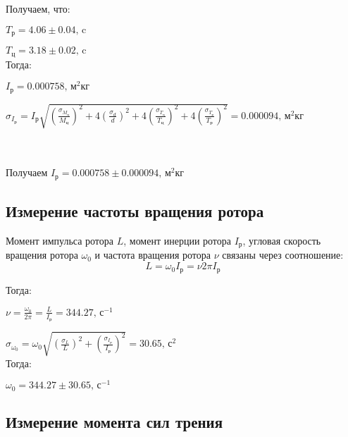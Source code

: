 \documentclass[a4paper]{article}
\begin{document}
Получаем, что:

\item $T_\text{р} = 4.06 \pm{0.04} \text{, c}$
\item $T_\text{ц} = 3.18 \pm{0.02} \text{, c}$\\

Тогда:

\item $I_\text{р} = 0.000758 \text{, м$^2$кг}$

\item $\sigma_{I_\text{р}} = I_\text{р} \sqrt{(\frac{\sigma_{M_\text{ц}}}{M_\text{ц}})^2 + 4 (\frac{\sigma_d}{d})^2 + 4 (\frac{\sigma_{T_\text{ц}}}{T_\text{ц}})^2 + 4 (\frac{\sigma_{T_\text{р}}}{T_\text{р}})^2} = 0.000094 \text{, м$^2$кг}$\\

\\\\

\item Получаем $I_\text{р} = 0.000758 \pm{0.000094} \text{, м$^2$кг}$


\subsection{Измерение частоты вращения ротора}

Момент импульса ротора $L$, момент инерции ротора $I_\text{р}$, угловая скорость вращения ротора $\omega_0$ и частота вращения ротора $\nu$ связаны через соотношение:
\begin{equation}
    L = \omega_0 I_\text{р} = \nu 2\pi I_\text{р}
\end{equation}

Тогда:

\item  $\nu = \frac{\omega_0}{2\pi} = \frac{L}{I_\text{р}} = 344.27 \text{, с$^{-1}$}$
\item $\sigma_{\omega_0} = \omega_0 \sqrt{(\frac{\sigma_L}{L})^2 + (\frac{\sigma_{I_\text{р}}}{I_\text{р}})^2} = 30.65 \text{, с$^2$}$\\

Тогда:

\item $\omega_0 = 344.27 \pm{30.65} \text{, с$^{-1}$}$

\subsection{Измерение момента сил трения}
\end{document}
